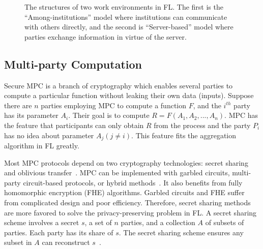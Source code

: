 \begin{figure}[!ht]
    \centering
    \hfil
    \caption{The structures of two work environments in FL. The first is the ``Among-institutions'' model where institutions can communicate with others directly, and the second is ``Server-based'' model where parties exchange information in virtue of the server.}
    \label{fl_sit}
\end{figure}

\subsection{Multi-party Computation}
Secure MPC is a branch of cryptography which enables several parties to compute a particular function without leaking their own data (inputs). Suppose there are $n$ parties employing MPC to compute a function $F$, and the $i^{th}$ party has its parameter $A_i$. Their goal is to compute $R = F(A_1, A_2, ..., A_n)$. MPC has the feature that participants can only obtain $R$ from the process and the party $P_i$ has no idea about parameter $A_j (j \ne i)$. This feature fits the aggregation algorithm in FL greatly.

Most MPC protocols depend on two cryptography technologies: secret sharing~\cite{Shamir} and oblivious transfer~\cite{OT}. MPC can be implemented with garbled circuits, multi-party circuit-based protocols, or hybrid methods~\cite{mpc-sok}. It also benefits from fully homomorphic encryption (FHE) algorithms. Garbled circuits and FHE suffer from complicated design and poor efficiency. Therefore, secret sharing methods are more favored to solve the privacy-preserving problem in FL. A secret sharing scheme involves a secret $s$, a set of $n$ parties, and a collection $A$ of subsets of parties. Each party has its share of $s$. The secret sharing scheme ensures any subset in $A$ can reconstruct $s$~\cite{Secret-Sharing-survey}. 

